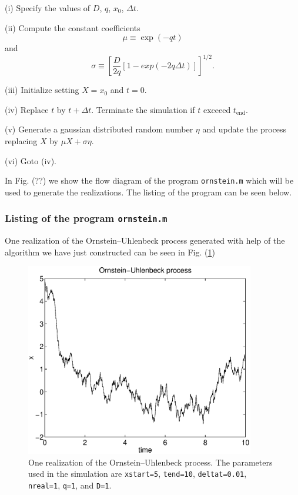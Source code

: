 (i) Specify the values of $D$, $q$, $x_0$, $\Delta t$.

(ii) Compute the constant coefficients 
\begin{equation*}
\mu \equiv \exp(-qt)
\end{equation*}
and
\begin{equation*}
\sigma \equiv \left[ \frac{D}{2q} [1-exp(-2q\Delta t)] 
\right]^{1/2}.
\end{equation*}

(iii) Initialize setting $X=x_0$ and $t=0$.

(iv) Replace $t$ by $t+\Delta t$. Terminate the simulation if $t$
exceeed $t_{\text{end}}$.

(v) Generate a gaussian distributed random number $\eta$ and 
update the process replacing $X$ by $\mu X + \sigma \eta$.

(vi) Goto (iv).

In Fig. (??) we show the flow diagram of the program 
\texttt{ornstein.m} which will be used to generate the 
realizations. The listing of the program can be seen below.

\subsubsection{Listing of the program \texttt{ornstein.m}}

One realization of the Ornstein--Uhlenbeck process generated with 
help of the algorithm we have just constructed can be seen in Fig.
(\ref{F_ORNSTEIN_R})

\begin{figure}
\label{F_ORNSTEIN_R}
\includegraphics[width=10cm]{./Figures/f_ornstein_r.eps}
\caption{One realization of the Ornstein--Uhlenbeck process. The
 parameters used in the simulation are \texttt{xstart=5},
\texttt{tend=10}, \texttt{deltat=0.01}, \texttt{nreal=1},
\texttt{q=1}, and \texttt{D=1}.}
\end{figure}

